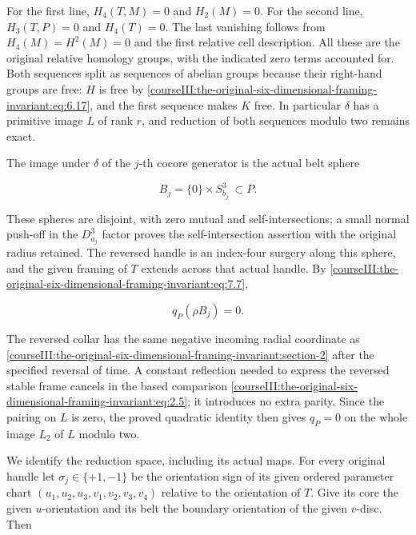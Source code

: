 For the first line, \(H_4(T,M)=0\) and \(H_2(M)=0\). For the second line, \(H_3(T,P)=0\) and \(H_4(T)=0\). The last vanishing follows from \(H_4(M)=H^2(M)=0\) and the first relative cell description. All these are the original relative homology groups, with the indicated zero terms accounted for. Both sequences split as sequences of abelian groups because their right-hand groups are free: \(H\) is free by \eqref{courseIII:the-original-six-dimensional-framing-invariant:eq:6.17}, and the first sequence makes \(K\) free. In particular \(\delta\) has a primitive image \(L\) of rank \(r\), and reduction of both sequences modulo two remains exact.

The image under \(\delta\) of the \(j\)-th cocore generator is the actual belt sphere

\begin{equation}
B_j=\{0\}\times S^3_{b_j}\ \subset P.
 \label{courseIII:the-original-six-dimensional-framing-invariant:eq:8.2}
\end{equation}

These spheres are disjoint, with zero mutual and self-intersections; a small normal push-off in the \(D^3_{a_j}\) factor proves the self-intersection assertion with the original radius retained. The reversed handle is an index-four surgery along this sphere, and the given framing of \(T\) extends across that actual handle. By \eqref{courseIII:the-original-six-dimensional-framing-invariant:eq:7.7},

\begin{equation}
q_P(\rho B_j)=0.
 \label{courseIII:the-original-six-dimensional-framing-invariant:eq:8.3}
\end{equation}

The reversed collar has the same negative incoming radial coordinate as \cref{courseIII:the-original-six-dimensional-framing-invariant:section-2} after the specified reversal of time. A constant reflection needed to express the reversed stable frame cancels in the based comparison \eqref{courseIII:the-original-six-dimensional-framing-invariant:eq:2.5}; it introduces no extra parity. Since the pairing on \(L\) is zero, the proved quadratic identity then gives \(q_P=0\) on the whole image \(L_2\) of \(L\) modulo two.

We identify the reduction space, including its actual maps. For every original handle let \(\sigma_j\in\{+1,-1\}\) be the orientation sign of its given ordered parameter chart
\((u_1,u_2,u_3,v_1,v_2,v_3,v_4)\)
relative to the orientation of \(T\). Give its core the given \(u\)-orientation and its belt the boundary orientation of the given \(v\)-disc. Then

